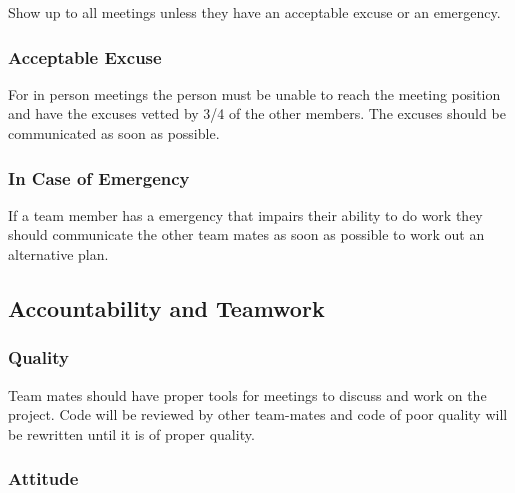 \documentclass{article}
\begin{document}
Show up to all meetings unless they have an acceptable excuse or an emergency. 

\subsubsection*{Acceptable Excuse}

For in person meetings the person must be unable to reach the meeting position and have the excuses vetted by 3/4 of the other members. The excuses should be communicated as soon as possible.  

\subsubsection*{In Case of Emergency}


If a team member has a emergency that impairs their ability to do work they should communicate the other team mates as soon as possible to work out an alternative plan.

\subsection*{Accountability and Teamwork}

\subsubsection*{Quality} 

Team mates should have proper tools for meetings to discuss and work on the project.
Code will be reviewed by other team-mates and code of poor quality will be rewritten  until it is of proper quality.

\subsubsection*{Attitude}
\end{document}
